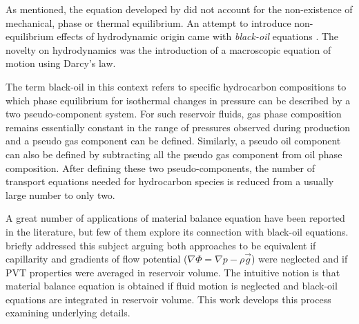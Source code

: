 \documentclass[authoryear,preprint,review,11pt]{elsarticle}
\begin{document}
As mentioned, the equation developed by \cite{schilthuis1936active} did not account for the non-existence of mechanical, phase or thermal equilibrium. An attempt to introduce non-equilibrium effects of hydrodynamic origin came with \textit{black-oil} equations \citep{aziz1979petroleum,blackoil}. The novelty on hydrodynamics was the introduction of a macroscopic equation of motion using Darcy's law. 


The term black-oil in this context refers to specific hydrocarbon compositions to which phase equilibrium for isothermal changes in pressure can be described by a two pseudo-component system. For such reservoir fluids, gas phase composition remains essentially constant in the range of pressures observed during production and a pseudo gas component can be defined. Similarly, a pseudo oil component can also be defined by subtracting all the pseudo gas component from oil phase composition. After defining these two pseudo-components, the number of transport equations needed for hydrocarbon species is reduced from a usually large number to only two.



A great number of applications of material balance equation have been reported in the literature, but few of them explore its connection with black-oil equations. \cite{ertekin2001basic} briefly addressed this subject arguing both approaches to be equivalent if capillarity and gradients of flow potential ($\nabla \Phi = \nabla p - \rho \vec{g}$) were neglected and if PVT properties were averaged in reservoir volume. The intuitive notion is that material balance equation is obtained if fluid motion is neglected and black-oil equations are integrated in reservoir volume. This work develops this process examining underlying details.
\end{document}
